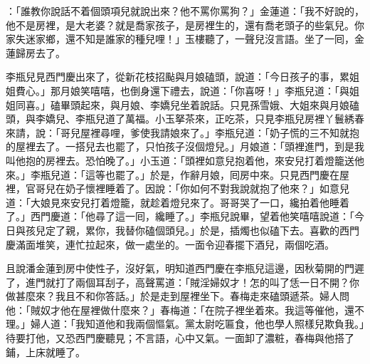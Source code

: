 ：「誰教你說話不着個頭項兒就說出來？他不罵你罵狗？」金蓮道：「我不好說的，他不是房裡，是大老婆？就是喬家孩子，是房裡生的，還有喬老頭子的些氣兒。你家失迷家鄉，還不知是誰家的種兒哩！」玉樓聽了，一聲兒沒言語。坐了一囘，金蓮歸房去了。

李瓶兒見西門慶出來了，從新花枝招颭與月娘磕頭，說道：「今日孩子的事，累姐姐費心。」{}那月娘笑嘻嘻，也倒身還下禮去，說道：「你喜呀！」李瓶兒道：「與姐姐同喜。」磕畢頭起來，與月娘、李嬌兒坐着說話。只見孫雪娥、大姐來與月娘磕頭，與李嬌兒、李瓶兒道了萬福。小玉拏茶來，正吃茶，只見李瓶兒房裡丫鬟綉春來請，說：「哥兒屋裡尋哩，爹使我請娘來了。」李瓶兒道：「奶子慌的三不知就抱的屋裡去了。一搭兒去也罷了，只怕孩子沒個燈兒。」月娘道：「頭裡進門，到是我叫他抱的房裡去。恐怕晚了。」小玉道：「頭裡如意兒抱着他，來安兒打着燈籠送他來。」李瓶兒道：「這等也罷了。」於是，作辭月娘，囘房中來。只見西門慶在屋裡，官哥兒在奶子懷裡睡着了。因說：「你如何不對我說就抱了他來？」如意兒道：「大娘見來安兒打着燈籠，就趁着燈兒來了。哥哥哭了一口，纔拍着他睡着了。」西門慶道：「他尋了這一囘，纔睡了。」李瓶兒說畢，望着他笑嘻嘻說道：「今日與孩兒定了親，累你，我替你磕個頭兒。」於是，插燭也似磕下去。喜歡的西門慶滿面堆笑，連忙拉起來，做一處坐的。一面令迎春擺下酒兒，兩個吃酒。

且說潘金蓮到房中使性子，沒好氣，明知道西門慶在李瓶兒這邊，因秋菊開的門遲了，進門就打了兩個耳刮子，高聲罵道：「賊淫婦奴才！怎的叫了恁一日不開？你做甚麼來？我且不和你答話。」於是走到屋裡坐下。春梅走來磕頭遞茶。婦人問他：「賊奴才他在屋裡做什麼來？」春梅道：「在院子裡坐着來。我這等催他，還不理。」婦人道：「我知道他和我兩個慪氣。黨太尉吃匾食，他也學人照樣兒欺負我。」待要打他，又恐西門慶聽見；不言語，心中又氣。{}一面卸了濃粧，春梅與他搭了鋪，上床就睡了。

